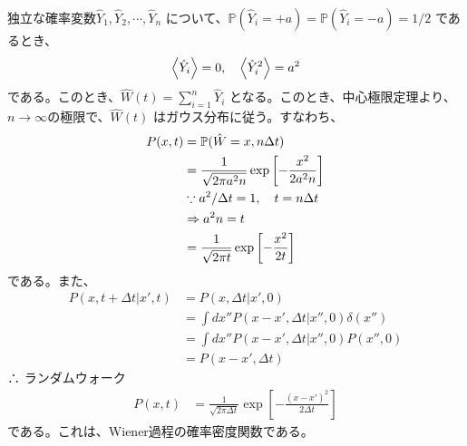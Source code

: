 \documentclass[a4paper,11pt]{jsarticle}
\numberwithin{equation}{section}
\begin{document}
独立な確率変数$\hat{Y}_1, \hat{Y}_2, \cdots, \hat{Y}_n$ について、$\mathbb{P}(\hat{Y}_i = +a)=\mathbb{P}(\hat{Y}_i = -a)=1/2$ であるとき、
\begin{align}
    \ev{\hat{Y}_i} = 0, \quad \ev{\hat{Y}_i^2} = a^2
\end{align}
である。このとき、$\hat{W}(t) = \sum_{i=1}^{n} \hat{Y}_i$ となる。このとき、中心極限定理より、$n \to \infty $の極限で、$\hat{W}(t)$ はガウス分布に従う。すなわち、
\begin{align}
  P(x,t) &= \mathbb{P}(\hat{W} = x, n \Delta t) \\
  &= \frac{1}{\sqrt{2 \pi a^2 n}} \exp \left[ - \frac{x^2}{2 a^2 n} \right] \\
  &\because a^2 / \Delta t = 1, \quad t = n \Delta t \notag\\
  &\Rightarrow a^2 n = t \notag\\
  &= \frac{1}{\sqrt{2 \pi t}} \exp \left[ - \frac{x^2}{2 t} \right]
\end{align}
である。また、
\begin{align}
  P(x, t + \Delta t | x', t) &= P(x, \Delta t | x', 0) \\
  &= \int dx'' P(x - x', \Delta t | x'', 0) \delta(x'') \\
  &= \int dx'' P(x - x', \Delta t | x'', 0) P(x'', 0) \\
  &= P(x - x', \Delta t)
\end{align}
∴ ランダムウォーク
\begin{align}
  P(x,t) &= \frac{1}{\sqrt{2 \pi \Delta t}} \exp \left[ - \frac{(x - x')^2}{2 \Delta t} \right]
\end{align}
である。これは、Wiener過程の確率密度関数である。\\
\end{document}
